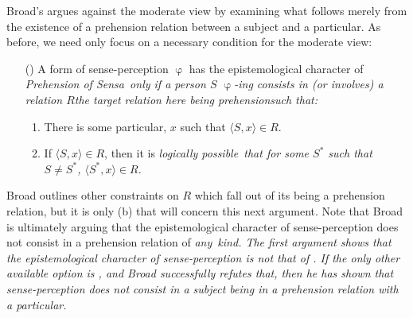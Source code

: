 Broad's argues against the moderate view by examining what follows merely from the existence of a prehension relation between a subject and a particular. As before, we need only focus on a necessary condition for the moderate view:
\begin{enumerate}

	\item[(\PRS)] A form of sense-perception $\upvarphi$ has the epistemological character of \em Prehension of Sensa\em\ only if a person $S$ $\upvarphi$-ing consists in (or involves) a relation $R$\textemdash the target relation here being prehension\textemdash such that:
	\begin{enumerate}
		\item There is some particular, $x$ such that $\langle S,x\rangle \in R$.
		\item If $\langle S,x\rangle \in R$, then it is \em logically possible\em\ that for some $S^*$ such that $S\neq S^*$, $\langle S^*,x\rangle \in R$.
	\end{enumerate}

\end{enumerate}
Broad outlines other constraints on $R$ which fall out of its being a prehension relation, but it is only (b) that will concern this next argument. Note that Broad is ultimately arguing that the epistemological character of sense-perception does not consist in a prehension relation of \em any\em\ kind. The first argument shows that the epistemological character of sense-perception is not that of \PRO. If the only other available option is \PRS, and Broad successfully refutes \em that\em, then he has shown that sense-perception does not consist in a subject being in a prehension relation with a particular.


